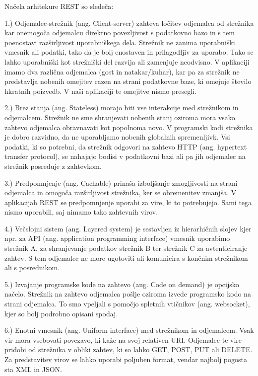 \documentclass[a4paper, 12pt]{book}
\begin{document}
Načela arhitekure REST so sledeča:

1.) Odjemalec-strežnik (ang. Client-server) zahteva ločitev odjemalca od strežnika kar onemogoča odjemalcu direktno povezljivost s podatkovno bazo in s tem poenostavi razširljivost uporabniškega dela. Strežnik ne zanima uporabniški vmesnik ali podatki, tako da je bolj enostaven in prilagodljiv za uporabo. Tako se lahko uporabniški kot strežniški del razvija ali zamenjuje neodvisno. V aplikaciji imamo dva različna odjemalca (gost in natakar/kuhar), kar pa za strežnik ne predstavlja nobenih omejitev razen na strani podatkovne baze, ki omejuje število hkratnih poizvedb. V naši aplikaciji te omejitve nismo presegli.

2.) Brez stanja (ang. Stateless) morajo biti vse interakcije med strežnikom in odjemalcem. Strežnik ne sme shranjevati nobenih stanj oziroma mora vsako zahtevo odjemalca obravnavati kot popolnoma novo. V programski kodi strežnika je dobro razvidno, da ne uporabljamo nobenih globalnih spremenljivk. Vsi podatki, ki so potrebni, da strežnik odgovori na zahtevo HTTP (ang. hypertext transfer protocol), se nahajajo bodisi v podatkovni bazi ali pa jih odjemalec na strežnik posreduje z zahtevkom.

3.) Predpomnjenje (ang. Cachable) prinaša izboljšanje zmogljivosti na strani odjemalca in omogoča razširljivost strežnika, ker se obremenitev zmanjša. V aplikacijah REST se predpomnjenje uporabi za vire, ki to potrebujejo. Sami tega nismo uporabili, saj nimamo tako zahtevnih virov.

4.) Večslojni sistem (ang. Layered system) je sestavljen iz hierarhičnih slojev kjer npr. za API (ang. application programming interface) vmesnik uporabimo strežnik A, za shranjevanje podatkov strežnik B ter strežnik C za avtenticiranje zahtev. S tem odjemalec ne more ugotoviti ali komunicira s končnim strežnikom ali s posrednikom.

5.) Izvajanje programske kode na zahtevo (ang. Code on demand) je opcijsko načelo. Strežnik na zahtevo odjemalca pošlje oziroma izvede programsko kodo na strani odjemalca. To smo vpeljali s pomočjo spletnih vtičnikov (ang. websocket), kjer so bolj podrobno opisani spodaj.

6.) Enotni vmesnik (ang. Uniform interface) med strežnikom in odjemalcem. Vsak vir mora vsebovati povezavo, ki kaže na svoj relativen URI. Odjemalec te vire pridobi od strežnika v obliki zahtev, ki so lahko GET, POST, PUT ali DELETE. Za predstavitev virov se lahko uporabi poljuben format, vendar najbolj pogosta sta XML in JSON. 
\end{document}
